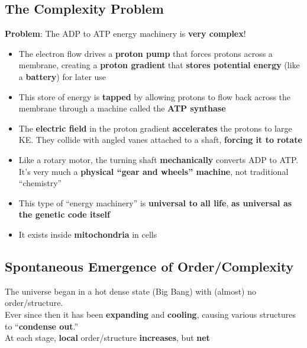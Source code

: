 \documentclass[12pt]{article}
\theoremstyle{definition}
\begin{document}
\subsection{The Complexity Problem}
\textbf{Problem}: The ADP to ATP energy machinery is \textbf{very complex}!
\begin{itemize}
  \item The electron flow drives a \textbf{proton pump} that forces protons across a membrane, creating a \textbf{proton gradient} that \textbf{stores potential energy} (like a \textbf{battery}) for later use
  \item This store of energy is \textbf{tapped} by allowing protons to flow back across the membrane through a machine called the \textbf{ATP synthase}
  \item The \textbf{electric field} in the proton gradient \textbf{accelerates} the protons to large KE.
  They collide with angled vanes attached to a shaft, \textbf{forcing it to rotate}
  \item Like a rotary motor, the turning shaft \textbf{mechanically} converts ADP to ATP.
  It's very much a \textbf{physical ``gear and wheels'' machine}, not traditional ``chemistry''
  \item This type of ``energy machinery'' is \textbf{universal to all life}, \textbf{as universal as the genetic code itself}
  \item It exists inside \textbf{mitochondria} in cells
\end{itemize}

\subsection{Spontaneous Emergence of Order/Complexity}
The universe began in a hot dense state (Big Bang) with (almost) no order/structure. \\
Ever since then it has been \textbf{expanding} and \textbf{cooling}, causing various structures to ``\textbf{condense out}.'' \\

At each stage, \textbf{local} order/structure \textbf{increases}, but \textbf{net} \\





\clearpage
\printindex
\end{document}
